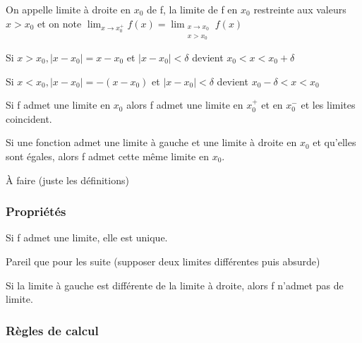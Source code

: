 \documentclass[a4paper, 12pt]{article}
\begin{document}

\begin{definition}
    On appelle limite à droite en $x_0$ de f, la limite de f en $x_0$ restreinte aux valeurs $x \gt x_0$ et on note
    $\lim_{x \to x_0^+} f(x) = \lim_{\substack{x \to x_0 \\ x \gt x_0}}f(x)$
\end{definition}

\begin{remark}
    \item Si $x \gt x_0, |x - x_0| = x-x_0$ et $|x - x_0| \lt \delta$ devient $x_0 \lt x \lt x_0 + \delta$
    \item Si $x \lt x_0, |x - x_0| = -(x-x_0)$ et $|x - x_0| \lt \delta$ devient $x_0-\delta \lt x \lt x_0$
\end{remark}

\begin{proposition}
    \item Si f admet une limite en $x_0$ alors f admet une limite en $x_0^+$ et en $x_0^-$ et les limites coincident.
    \item Si une fonction admet une limite à gauche et une limite à droite en $x_0$ et qu'elles sont égales, alors f admet cette même limite en $x_0$.
\end{proposition}

\begin{demonstration}
    À faire (juste les définitions)
\end{demonstration}

\subsubsection{Propriétés}

\begin{theorem}
    Si f admet une limite, elle est unique.
\end{theorem}

\begin{demonstration}
    Pareil que pour les suite (supposer deux limites différentes puis absurde)
\end{demonstration}

\begin{corollaire}
    Si la limite à gauche est différente de la limite à droite, alors f n'admet pas de limite.
\end{corollaire}

\subsubsection{Règles de calcul}
\end{document}

